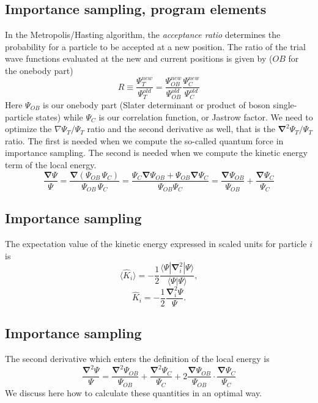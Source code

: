 \documentclass[%
oneside,                 %
final,                   %
10pt]{article}
\begin{document}
\subsection{Importance sampling, program elements}

In the Metropolis/Hasting algorithm, the \emph{acceptance ratio} determines the probability for a particle  to be accepted at a new position. The ratio of the trial wave functions evaluated at the new and current positions is given by ($OB$ for the onebody  part)
\[
R \equiv \frac{\Psi_{T}^{new}}{\Psi_{T}^{old}} = 
\frac{\Psi_{OB}^{new}}{\Psi_{OB}^{old}}\frac{\Psi_{C}^{new}}{\Psi_{C}^{old}}
\]
Here $\Psi_{OB}$ is our onebody part (Slater determinant or product of boson single-particle states)  while $\Psi_{C}$ is our correlation function, or Jastrow factor. 
We need to optimize the $\nabla \Psi_T / \Psi_T$ ratio and the second derivative as well, that is
the $\mathbf{\nabla}^2 \Psi_T/\Psi_T$ ratio. The first is needed when we compute the so-called quantum force in importance sampling.
The second is needed when we compute the kinetic energy term of the local energy.
\[
\frac{\mathbf{\mathbf{\nabla}}  \Psi}{\Psi}  = \frac{\mathbf{\nabla}  (\Psi_{OB} \, \Psi_{C})}{\Psi_{OB} \, \Psi_{C}}  =  \frac{ \Psi_C \mathbf{\nabla}  \Psi_{OB} + \Psi_{OB} \mathbf{\nabla}  \Psi_{C}}{\Psi_{OB} \Psi_{C}} = \frac{\mathbf{\nabla}  \Psi_{OB}}{\Psi_{OB}} + \frac{\mathbf{\nabla}   \Psi_C}{ \Psi_C}
\]

\subsection{Importance sampling}

The expectation value of the kinetic energy expressed in scaled units  for particle  $i$ is 
\[
 \langle \hat{K}_i \rangle = -\frac{1}{2}\frac{\langle\Psi|\mathbf{\nabla}_{i}^2|\Psi \rangle}{\langle\Psi|\Psi \rangle},
\]
\[
\hat{K}_i = -\frac{1}{2}\frac{\mathbf{\nabla}_{i}^{2} \Psi}{\Psi}.
\]

\subsection{Importance sampling}

The second derivative which enters the definition of the local energy is 
\[
\frac{\mathbf{\nabla}^2 \Psi}{\Psi}=\frac{\mathbf{\nabla}^2 \Psi_{OB}}{\Psi_{OB}} + \frac{\mathbf{\nabla}^2  \Psi_C}{ \Psi_C} + 2 \frac{\mathbf{\nabla}  \Psi_{OB}}{\Psi_{OB}}\cdot\frac{\mathbf{\nabla}   \Psi_C}{ \Psi_C}
\]
We discuss here how to calculate these quantities in an optimal way.
\end{document}
